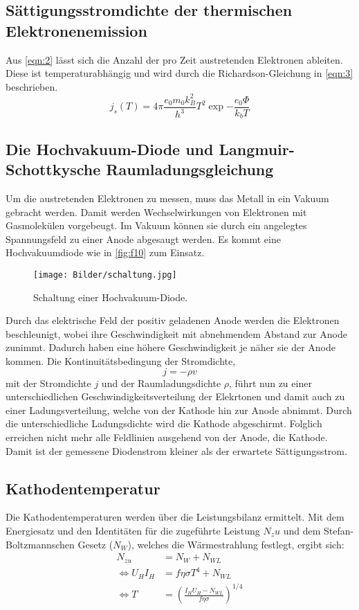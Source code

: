 \subsection{Sättigungsstromdichte der thermischen Elektronenemission}
Aus \autoref{eqn:2} lässt sich die Anzahl der pro Zeit austretenden Elektronen
ableiten. Diese ist temperaturabhängig und wird durch die Richardson-Gleichung
in \autoref{eqn:3} beschrieben.
\begin{equation}
    \label{eqn:3}
    j_s \left(T\right) = 4\pi \frac{e_0m_0k_B^2}{h^3}T^2\exp{-\frac{e_0\Phi}{k_b T}}
\end{equation}

\subsection{Die Hochvakuum-Diode und Langmuir-Schottkysche Raumladungsgleichung}
\label{sec:refdufotze}
Um die austretenden Elektronen zu messen, muss das Metall in ein Vakuum gebracht
werden. Damit werden Wechselwirkungen von Elektronen mit Gasmolekülen vorgebeugt. 
Im Vakuum können sie durch ein angelegtes Spannungsfeld zu einer Anode abgesaugt
werden. Es kommt eine Hochvakuumdiode wie in \autoref{fig:f10} zum Einsatz.
\begin{figure}[H]
    \centering
        \centering
        \texttt{[image: Bilder/schaltung.jpg]}
        \caption{Schaltung einer Hochvakuum-Diode. \cite{anleitung4}}
    \hfill
    \label{fig:f10}
\end{figure}
\noindent Durch das elektrische Feld der positiv geladenen Anode werden die Elektronen
beschleunigt, wobei ihre Geschwindigkeit mit abnehmendem Abstand zur Anode
zunimmt. Dadurch haben eine höhere Geschwindigkeit je näher sie
der Anode kommen. Die Kontinuitätsbedingung der Stromdichte, 
\begin{equation}
j = -\rho v
\end{equation}
mit der Stromdichte $j$ und der Raumladungsdichte $\rho$, führt nun zu einer
unterschiedlichen Geschwindigkeitsverteilung der Elekrtonen und damit auch zu
einer Ladungsverteilung, welche von der Kathode hin zur Anode abnimmt. Durch
die unterschiedliche Ladungsdichte wird die Kathode abgeschirmt. Folglich erreichen 
nicht mehr alle Feldlinien ausgehend von der Anode, die Kathode. Damit ist der
gemessene Diodenstrom kleiner als der erwartete Sättigungsstrom.

\subsection{Kathodentemperatur}
\label{sec:kattemp}
Die Kathodentemperaturen werden über die Leistungsbilanz ermittelt. Mit dem 
Energiesatz und den Identitäten für die zugeführte Leistung $N_zu$ und dem 
Stefan-Boltzmannschen Gesetz ($N_W$), welches die Wärmestrahlung festlegt,
ergibt sich:
\begin{align*}
                         N_{zu} &= N_W + N_{WL} \\
    \Longleftrightarrow U_H I_H &= f \eta \sigma T^4 + N_{WL} \\
    \Longleftrightarrow       T &= \left(\frac{I_H U_H - N_{WL}}{f \eta \sigma}\right)^{1/4}
\end{align*}

